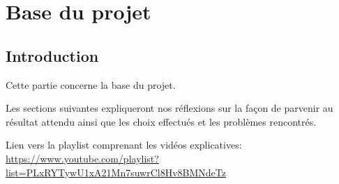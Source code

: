 \section{Base du projet}
\subsection{Introduction}
\begin{flushleft}
Cette partie concerne la base du projet.
\end{flushleft}
\begin{flushleft}
Les sections suivantes expliqueront nos réflexions sur la façon de parvenir au résultat attendu ainsi que les choix effectués et les problèmes rencontrés.
\end{flushleft}
\begin{flushleft}
Lien vers la playlist comprenant les vidéos explicatives:
\href{https://www.youtube.com/playlist?list=PLxRYTywU1xA21Mn7suwrCl8Hv8BMNdeTz}{https://www.youtube.com/playlist?list=PLxRYTywU1xA21Mn7suwrCl8Hv8BMNdeTz}
\end{flushleft}
